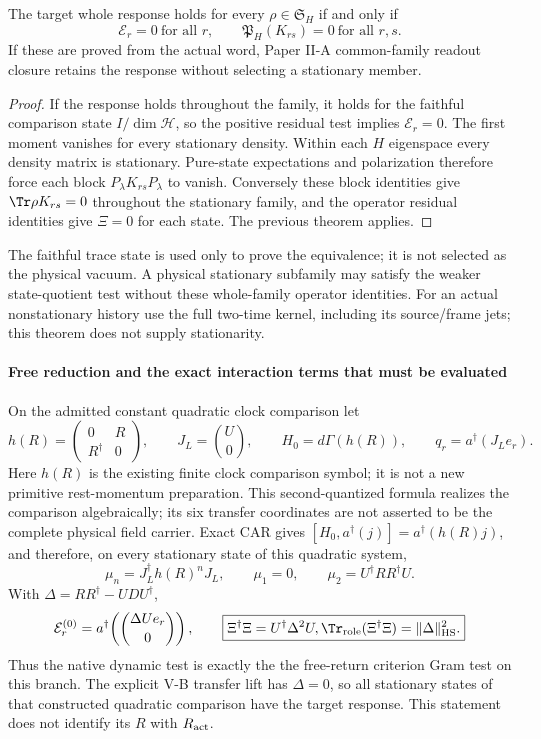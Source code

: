 \documentclass[12pt,a4paper]{article}
\begin{document}
\begin{theorem}
\label{p4:thm:v2168-stationary-family-fidelity}
The target whole response holds for every $\rho\in\mathfrak S_H$ if and only if
\[
 \boxed{\mathcal E_r=0\ \text{for all }r,\qquad
        \mathfrak P_H(K_{rs})=0\ \text{for all }r,s.}
\]
If these are proved from the actual word, Paper II-A common-family readout
closure retains the response without selecting a stationary member.
\end{theorem}
\begin{proof}
If the response holds throughout the family, it holds for the faithful
comparison state $I/\dim\mathcal H$, so the positive residual test implies
$\mathcal E_r=0$. The first moment vanishes for every stationary density.
Within each $H$ eigenspace every density matrix is stationary. Pure-state
expectations and polarization therefore force each block
$P_\lambda K_{rs}P_\lambda$ to vanish. Conversely these block identities
give $\Tr\rho K_{rs}=0$ throughout the stationary family, and the operator
residual identities give $\Xi=0$ for each state. The previous theorem applies.
\end{proof}

The faithful trace state is used only to prove the equivalence; it is not
selected as the physical vacuum. A physical stationary subfamily may satisfy
the weaker state-quotient test without these whole-family operator identities.
For an actual nonstationary history use the full two-time kernel, including
its source/frame jets; this theorem does not supply stationarity.



\paragraph{Free reduction and the exact interaction terms that must be evaluated}
On the admitted constant quadratic clock comparison let
\[
 h(R)=\begin{pmatrix}0&R\\R^\dagger&0\end{pmatrix},\qquad
 J_L=\binom{U}{0},\qquad
 H_0=d\Gamma(h(R)),\qquad q_r=a^\dagger(J_Le_r).
\]
Here $h(R)$ is the existing finite clock comparison symbol; it is not a new
primitive rest-momentum preparation. This second-quantized formula realizes
the comparison algebraically; its six transfer coordinates are not asserted
to be the complete physical field carrier. Exact CAR gives
$[H_0,a^\dagger(j)]=a^\dagger(h(R)j)$, and therefore, on every stationary
state of this quadratic system,
\[
 \mu_n=J_L^\dagger h(R)^nJ_L,
 \qquad \mu_1=0,\qquad \mu_2=U^\dagger RR^\dagger U.
\]
With $\Delta=RR^\dagger-UDU^\dagger$,
\[
 \mathcal E_r^{(0)}=a^\dagger\!\left(\binom{\Delta Ue_r}{0}\right),
 \qquad
 \boxed{\Xi^\dagger\Xi=U^\dagger\Delta^2U,
        \Tr_{\rm role}(\Xi^\dagger\Xi)=\|\Delta\|_{\rm HS}^2.}
\]
Thus the native dynamic test is exactly the the free-return criterion Gram test on this branch.
The explicit V-B transfer lift has $\Delta=0$, so all stationary states of that
constructed quadratic comparison have the target response. This statement
does not identify its $R$ with $R_{\rm act}$.
\end{document}
